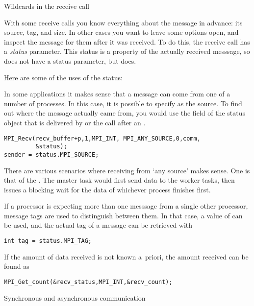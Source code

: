 

 {Wildcards in the receive call}
\label{sec:mpi-status}

With some receive calls you know everything about the message in advance:
its source, tag, and size. In other cases you want to leave some options
open, and inspect the message for them after it was received.
To do this, the receive call has a \emph{status}
parameter.
%
%
This status is a property of the actually received messsage, so 
does not have a status parameter, but  does.

Here are some of the uses of the status:

%
In some applications it makes sense that a message can come from 
one of a number of processes. In this case, it is possible to specify
 as the source. To find out where the message actually
came from, you would use the  field of the status object
that is delivered by  or the  call after an .
\begin{lstlisting}
MPI_Recv(recv_buffer+p,1,MPI_INT, MPI_ANY_SOURCE,0,comm,
         &status);
sender = status.MPI_SOURCE;
\end{lstlisting}

There are various scenarios where receiving from `any source' makes sense.
One is that of the . The master task would first send
data to the worker tasks, then issues a blocking wait for the data of whichever process
finishes first.

%
If a processor is expecting more than one messsage from a single other processor,
message tags are used to distinguish between them. In that case,
a value of  can be used, and the actual tag
of a message can be retrieved with
\begin{lstlisting}
int tag = status.MPI_TAG;
\end{lstlisting}

%
If the amount of data received is not known a~priori, the amount received
can be found as
\begin{lstlisting}
MPI_Get_count(&recv_status,MPI_INT,&recv_count);
\end{lstlisting}

 {Synchronous and asynchronous communication}

